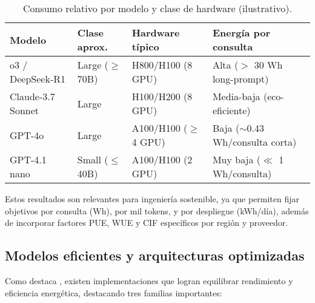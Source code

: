 \begin{table}[H]
    \centering
    \caption{Consumo relativo por modelo y clase de hardware (ilustrativo).}
    \begin{tabular}{p{3.2cm}p{2.7cm}p{3.2cm}p{4cm}}
    \toprule
    \textbf{Modelo} & \textbf{Clase aprox.} & \textbf{Hardware típico} & \textbf{Energía por consulta} \\
    \midrule
        o3 / DeepSeek-R1 & Large ($\geq$70B) & H800/H100 (8 GPU) & Alta ($>$ 30 Wh long-prompt) \\
        Claude-3.7 Sonnet & Large & H100/H200 (8 GPU) & Media-baja (eco-eficiente) \\
        GPT-4o & Large & A100/H100 ($\geq$4 GPU) & Baja ($\sim$0.43 Wh/consulta corta) \\
        GPT-4.1 nano & Small ($\leq$40B) & A100/H100 (2 GPU) & Muy baja ($\ll$ 1 Wh/consulta) \\
    \bottomrule
    \end{tabular}\label{tab:llm-huella}
\end{table}

Estos resultados son relevantes para ingeniería sostenible, ya que permiten fijar objetivos por consulta (Wh), por mil tokens, y por despliegue (kWh/día), además de incorporar factores PUE, WUE y CIF específicos por región y proveedor.

\subsection{Modelos eficientes y arquitecturas optimizadas}

Como destaca \textcite{yuan2025efficientllm}, existen implementaciones que logran equilibrar rendimiento y eficiencia energética, destacando tres familias importantes:

